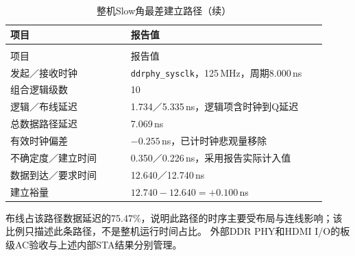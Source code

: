 \begin{reporttable}
\begin{longtable}{@{}p{0.35\linewidth}p{0.58\linewidth}@{}}
\caption{整机Slow角最差建立路径}\label{tbl:board-critical-setup}\\
\toprule
项目 & 报告值 \\
\midrule
\endfirsthead
\caption[]{整机Slow角最差建立路径（续）}\\
\toprule
项目 & 报告值 \\
\midrule
\endhead
\bottomrule
\endfoot
发起／接收时钟 & \texttt{ddrphy\_sysclk}，125\,MHz，周期8.000\,ns \\
组合逻辑级数 & 10 \\
逻辑／布线延迟 & 1.734／5.335\,ns，逻辑项含时钟到Q延迟 \\
总数据路径延迟 & 7.069\,ns \\
有效时钟偏差 & $-0.255$\,ns，已计时钟悲观量移除 \\
不确定度／建立时间 & 0.350／0.226\,ns，采用报告实际计入值 \\
数据到达／要求时间 & 12.640／12.740\,ns \\
建立裕量 & $12.740-12.640=+0.100$\,ns \\
\end{longtable}
\end{reporttable}

布线占该路径数据延迟的75.47\%，说明此路径的时序主要受布局与连线影响；该比例只描述此条路径，不是整机运行时间占比。
外部DDR PHY和HDMI I/O的板级AC验收与上述内部STA结果分别管理。

